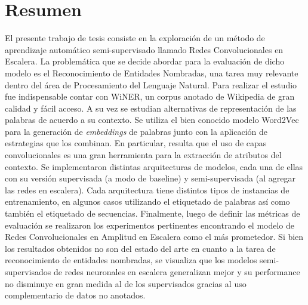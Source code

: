 \documentclass[12pt]{book}
\begin{document}








\chapter*{Resumen}

\pagestyle{plain}

El presente trabajo de tesis consiste en la exploración de un método de aprendizaje automático semi-supervisado llamado Redes Convolucionales en Escalera. La problemática que se decide abordar para la evaluación de dicho modelo es el Reconocimiento de Entidades Nombradas, una tarea muy relevante dentro del área de Procesamiento del Lenguaje Natural. Para realizar el estudio fue indispensable contar con WiNER, un corpus anotado de Wikipedia de gran calidad y fácil acceso. A su vez se estudian alternativas de representación de las palabras de acuerdo a su contexto. Se utiliza el bien conocido modelo Word2Vec para la generación de \textit{embeddings} de palabras junto con la aplicación de estrategias que los combinan. En particular, resulta que el uso de capas convolucionales es una gran herramienta para la extracción de atributos del contexto. Se implementaron distintas arquitecturas de modelos, cada una de ellas con su versión supervisada (a modo de baseline) y semi-supervisada (al agregar las redes en escalera). Cada arquitectura tiene distintos tipos de instancias de entrenamiento, en algunos casos utilizando el etiquetado de palabras así como también el etiquetado de secuencias. Finalmente, luego de definir las métricas de evaluación se realizaron los experimentos pertinentes encontrando el modelo de Redes Convolucionales en Amplitud en Escalera como el más prometedor. Si bien los resultados obtenidos no son del estado del arte en cuanto a la tarea de reconocimiento de entidades nombradas, se visualiza que los modelos semi-supervisados de redes neuronales en escalera generalizan mejor y su performance no disminuye en gran medida al de los supervisados gracias al uso complementario de datos no anotados.
\end{document}
